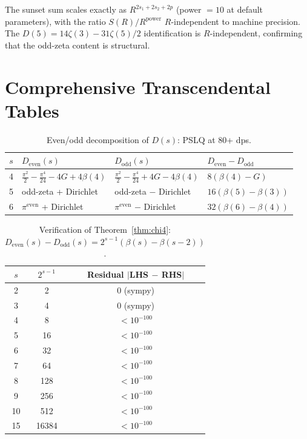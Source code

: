\documentclass[11pt]{article}
\begin{document}
The sunset sum scales exactly as $R^{2s_1 + 2s_2 + 2p}$ (power $= 10$
at default parameters), with the ratio $S(R)/R^{\mathrm{power}}$
$R$-independent to machine precision.  The $D(5) = 14\zeta(3) -
31\zeta(5)/2$ identification is $R$-independent, confirming that the
odd-zeta content is structural.

\section{Comprehensive Transcendental Tables}
\label{sec:tables}

\begin{table}[h]
\centering
\caption{Even/odd decomposition of $D(s)$: PSLQ at 80+ dps.}
\label{tab:D_even_odd}
\begin{tabular}{@{}clll@{}}
\toprule
$s$ & $D_{\mathrm{even}}(s)$ & $D_{\mathrm{odd}}(s)$ & $D_{\mathrm{even}} - D_{\mathrm{odd}}$ \\
\midrule
4 & $\frac{\pi^2}{2} - \frac{\pi^4}{24} - 4G + 4\beta(4)$
  & $\frac{\pi^2}{2} - \frac{\pi^4}{24} + 4G - 4\beta(4)$
  & $8(\beta(4) - G)$ \\[4pt]
5 & odd-zeta + Dirichlet
  & odd-zeta $-$ Dirichlet
  & $16(\beta(5) - \beta(3))$ \\[4pt]
6 & $\pi^{\mathrm{even}}$ + Dirichlet
  & $\pi^{\mathrm{even}}$ $-$ Dirichlet
  & $32(\beta(6) - \beta(4))$ \\
\bottomrule
\end{tabular}
\end{table}

\begin{table}[h]
\centering
\caption{Verification of Theorem~\ref{thm:chi4}: $D_{\mathrm{even}}(s) -
D_{\mathrm{odd}}(s) = 2^{s-1}(\beta(s) - \beta(s{-}2))$.}
\label{tab:chi4_verification}
\begin{tabular}{@{}ccc@{}}
\toprule
$s$ & $2^{s-1}$ & Residual $|$LHS $-$ RHS$|$ \\
\midrule
2 & 2 & 0 (sympy) \\
3 & 4 & 0 (sympy) \\
4 & 8 & $< 10^{-100}$ \\
5 & 16 & $< 10^{-100}$ \\
6 & 32 & $< 10^{-100}$ \\
7 & 64 & $< 10^{-100}$ \\
8 & 128 & $< 10^{-100}$ \\
9 & 256 & $< 10^{-100}$ \\
10 & 512 & $< 10^{-100}$ \\
15 & 16384 & $< 10^{-100}$ \\
\bottomrule
\end{tabular}
\end{table}
\end{document}
